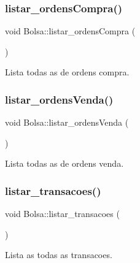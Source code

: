 \subsubsection{\texorpdfstring{listar\+\_\+ordens\+Compra()}{listar\_ordensCompra()}}
{\footnotesize\ttfamily void Bolsa\+::listar\+\_\+ordens\+Compra (\begin{DoxyParamCaption}{ }\end{DoxyParamCaption})}



Lista todas as de ordens compra. 

\hypertarget{class_bolsa_abd28d5b93c338a05deccf0adbac23ba1}{}\label{class_bolsa_abd28d5b93c338a05deccf0adbac23ba1} 
\subsubsection{\texorpdfstring{listar\+\_\+ordens\+Venda()}{listar\_ordensVenda()}}
{\footnotesize\ttfamily void Bolsa\+::listar\+\_\+ordens\+Venda (\begin{DoxyParamCaption}{ }\end{DoxyParamCaption})}



Lista todas as de ordens venda. 

\hypertarget{class_bolsa_a4676ec9295a14426f3c70e91dd36fde1}{}\label{class_bolsa_a4676ec9295a14426f3c70e91dd36fde1} 
\subsubsection{\texorpdfstring{listar\+\_\+transacoes()}{listar\_transacoes()}}
{\footnotesize\ttfamily void Bolsa\+::listar\+\_\+transacoes (\begin{DoxyParamCaption}{ }\end{DoxyParamCaption})}



Lista as todas as transacoes. 

\hypertarget{class_bolsa_ad96a358bf03c103f55b8139da8a0d61a}{}\label{class_bolsa_ad96a358bf03c103f55b8139da8a0d61a} 
